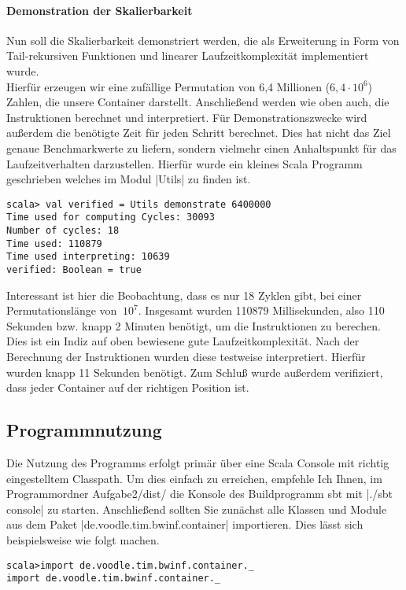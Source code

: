 \paragraph{Demonstration der Skalierbarkeit}
Nun soll die Skalierbarkeit demonstriert werden,
die als Erweiterung in Form von Tail-rekursiven Funktionen und linearer Laufzeitkomplexität implementiert wurde.\\
Hierfür erzeugen wir eine zufällige Permutation von 6,4 Millionen ($6,4 \cdot 10^6$) Zahlen, die unsere Container darstellt.
Anschließend werden wie oben auch, die Instruktionen berechnet und interpretiert.
Für Demonstrationszwecke wird außerdem die benötigte Zeit für jeden Schritt berechnet.
Dies hat nicht das Ziel genaue Benchmarkwerte zu liefern, sondern vielmehr einen Anhaltspunkt für das Laufzeitverhalten darzustellen.
Hierfür wurde ein kleines Scala Programm geschrieben welches im Modul |Utils| zu finden ist.
\begin{lstlisting}
scala> val verified = Utils demonstrate 6400000
Time used for computing Cycles: 30093
Number of cycles: 18
Time used: 110879
Time used interpreting: 10639
verified: Boolean = true
\end{lstlisting}
Interessant ist hier die Beobachtung, dass es nur 18 Zyklen gibt, bei einer Permutationslänge von $~10^7$.
Insgesamt wurden 110879 Millisekunden, also 110 Sekunden bzw. knapp 2 Minuten benötigt, um die Instruktionen zu berechen.
Dies ist ein Indiz auf oben bewiesene gute Laufzeitkomplexität.
Nach der Berechnung der Instruktionen wurden diese testweise interpretiert. Hierfür wurden knapp 11 Sekunden benötigt.
Zum Schluß wurde außerdem verifiziert, dass jeder Container auf der richtigen Position ist.

\subsection{Programmnutzung}
Die Nutzung des Programms erfolgt primär über eine Scala Console mit richtig eingestelltem Classpath.
Um dies einfach zu erreichen, empfehle Ich Ihnen, im Programmordner Aufgabe2/dist/ die Konsole des Buildprogramm sbt mit |./sbt console| zu starten.
Anschließend sollten Sie zunächst alle Klassen und Module aus dem Paket |de.voodle.tim.bwinf.container| importieren. Dies lässt sich beispielsweise wie folgt machen.
\begin{lstlisting}
scala>import de.voodle.tim.bwinf.container._
import de.voodle.tim.bwinf.container._
\end{lstlisting}
